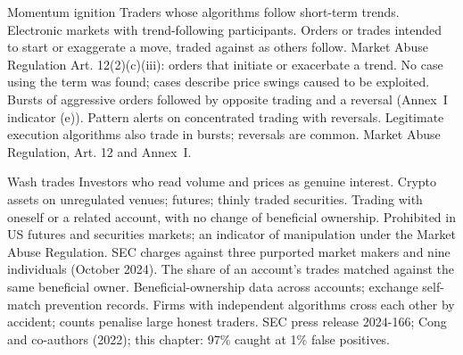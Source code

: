 \begin{strategyfile}{Momentum ignition}\label{strat:s2:manipulative-strategies-and-how-they-are-caught:momentum}
 Traders whose algorithms follow short-term trends.
 Electronic markets with trend-following participants.
 Orders or trades intended to start or exaggerate a move, traded against as others follow.
 Market Abuse Regulation Art. 12(2)(c)(iii): orders that initiate or exacerbate a trend.
 No case using the term was found;  cases describe price swings caused to be exploited.
 Bursts of aggressive orders followed by opposite trading and a reversal (Annex~I indicator (e)).
 Pattern alerts on concentrated trading with reversals.
 Legitimate execution algorithms also trade in bursts; reversals are common.
 Market Abuse Regulation, Art. 12 and Annex~I.
\end{strategyfile}

\begin{strategyfile}{Wash trades}\label{strat:s2:manipulative-strategies-and-how-they-are-caught:wash}
 Investors who read volume and prices as genuine interest.
 Crypto assets on unregulated venues; futures; thinly traded securities.
 Trading with oneself or a related account, with no change of beneficial ownership.
 Prohibited in US futures and securities markets; an indicator of manipulation under the Market Abuse Regulation.
 SEC charges against three purported market makers and nine individuals (October 2024).
 The share of an account's trades matched against the same beneficial owner.
 Beneficial-ownership data across accounts; exchange self-match prevention records.
 Firms with independent algorithms cross each other by accident; counts penalise large honest traders.
 SEC press release 2024-166; Cong and co-authors (2022); this chapter: 97\% caught at 1\% false positives.
\end{strategyfile}

